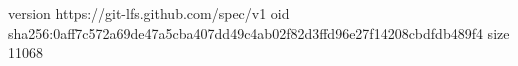 version https://git-lfs.github.com/spec/v1
oid sha256:0aff7c572a69de47a5cba407dd49c4ab02f82d3ffd96e27f14208cbdfdb489f4
size 11068
